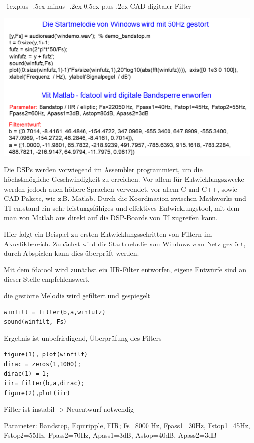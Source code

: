 \documentclass[a4paper]{article}
\makeatletter
\renewcommand{\subsection}{\@startsection{subsection}{2}{0mm}%
 {-1explus -.5ex minus -.2ex}%
 {0.5ex plus .2ex}%
 {\normalfont\normalsize\bfseries}}
\makeatother
\begin{document}
\begin{multicols}{3}
  \subsection{CAD digitaler Filter}\label{cad-digitaler-filter}
  \begin{itemize*}
    \item \includegraphics[width=.5\linewidth]{Assets/Biosignalverarbeitung-cad-digitaler-filter.png}
    \item Die DSPs werden vorwiegend im Assembler programmiert, um die höchstmögliche Geschwindigkeit zu erreichen. Vor allem für Entwicklungszwecke werden jedoch auch höhere Sprachen verwendet, vor allem C und C++, sowie CAD-Pakete, wie z.B. Matlab. Durch die Koordination zwischen Mathworks und TI entstand ein sehr leistungsfähiges und effektives Entwicklungstool, mit dem man von Matlab aus direkt auf die DSP-Boards von TI zugreifen kann.
    \item Hier folgt ein Beispiel zu ersten Entwicklungsschritten von Filtern im Akustikbereich: Zunächst wird die Startmelodie von Windows vom Netz gestört, durch Abspielen kann dies überprüft werden.
    \item Mit dem fdatool wird zunächst ein IIR-Filter entworfen, eigene Entwürfe sind an dieser Stelle empfehlenswert.
    \item die gestörte Melodie wird gefiltert und gespiegelt
    \begin{verbatim}
winfilt = filter(b,a,winfufz)
sound(winfilt, Fs)
\end{verbatim}
    \item Ergebnis ist unbefriedigend, Überprüfung des Filters
    \begin{verbatim}
figure(1), plot(winfilt)
dirac = zeros(1,1000);
dirac(1) = 1;
iir= filter(b,a,dirac);
figure(2),plot(iir)
\end{verbatim}
    \item Filter ist instabil -\textgreater{} Neuentwurf notwendig
    \begin{itemize*}
      \item Parameter: Bandstop, Equiripple, FIR; Fs=8000 Hz, Fpass1=30Hz, Fstop1=45Hz, Fstop2=55Hz, Fpass2=70Hz, Apass1=3dB, Astop=40dB, Apass2=3dB

\end{itemize*}
\end{itemize*}
\end{multicols}
\end{document}
